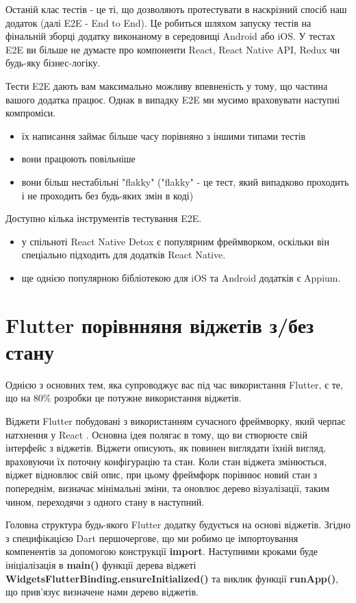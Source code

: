 Останій клас тестів - це ті, що дозволяють протестувати в наскрізний спосіб наш додаток (далі E2E - End to End).
Це робиться шляхом запуску тестів на фінальній зборці додатку виконаному в середовищі Android або iOS.
У тестах E2E ви більше не думаєте про компоненти React, React Native API, Redux чи будь-яку бізнес-логіку.

Тести E2E дають вам максимально можливу впевненість у тому, що частина вашого додатка працює.
Однак в випадку E2E ми мусимо враховувати наступні компроміси.

\begin{itemize}
    \item їх написання займає більше часу порівняно з іншими типами тестів
    \item вони працюють повільніше
    \item вони більш нестабільні "flakky" ("flakky"  - це тест, який випадково проходить і не проходить без будь-яких змін в коді)
\end{itemize}

Доступно кілька інструментів тестування E2E.
\begin{itemize}
    \item у спільноті React Native Detox є популярним фреймворком, оскільки він спеціально підходить для додатків React Native.\cite{detox_home_page}
    \item ще однією популярною бібліотекою для iOS та Android додатків є Appium.\cite{appium_home_page}
\end{itemize}


\section{Flutter порівнняня віджетів з/без стану}
\label{sec:flutter_widgets_theory}
Однією з основних тем, яка супроводжує вас під час використання Flutter, є те, що на 80\% розробки це потужне використання віджетів.

Віджети Flutter побудовані з використанням сучасного фреймворку, який черпає натхнення у React \cite{flutter_widgets_intro}.
Основна ідея полягає в тому, що ви створюєте свій інтерфейс з віджетів.
Віджети описують, як повинен виглядати їхній вигляд, враховуючи їх поточну конфігурацію та стан.
Коли стан віджета змінюється, віджет відновлює свій опис, при цьому фреймфорк порівнює новий стан з попереднім,
визначає мінімальні зміни, та оновлює дерево візуалізації, таким чином, переходячи з одного стану в наступний.

Головна структура будь-якого Flutter додатку будується на основі віджетів.
Згідно з специфікацією Dart першочергове, що ми робимо це імпортоування компенентів за допомогою конструкції \textbf{import}.
Наступними кроками буде ініціалізація в \textbf{main()} функції дерева віджеті \textbf{WidgetsFlutterBinding.ensureInitialized()} та
виклик функції \textbf{runApp()}, що прив'язує визначене нами дерево віджетів.

